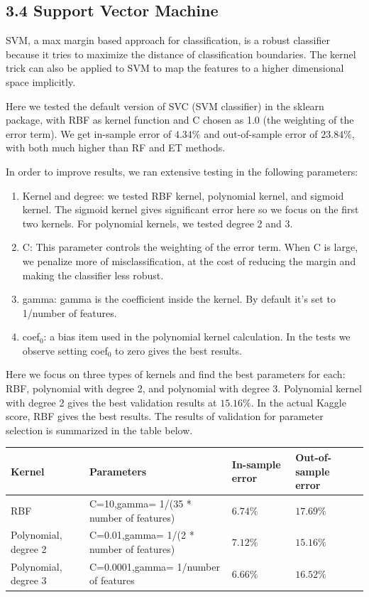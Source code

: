 \documentclass[submit]{harvardml}
\begin{document}
\subsection*{3.4 Support Vector Machine}

SVM, a max margin based approach for classification, is a robust classifier because it tries to maximize the distance of classification boundaries. The kernel trick can also be applied to SVM to map the features to a higher dimensional space implicitly. 

Here we tested the default version of SVC (SVM classifier) in the sklearn package, with RBF as kernel function and C chosen as 1.0 (the weighting of the error term). We get in-sample error of $4.34\%$ and out-of-sample error of $23.84\%$, with both much higher than RF and ET methods. 

In order to improve results, we ran extensive testing in the following parameters:
\begin{enumerate}
\item Kernel and degree: we tested RBF kernel, polynomial kernel, and sigmoid kernel. The sigmoid kernel gives significant error here so we focus on the first two kernels. For polynomial kernels, we tested degree 2 and 3.
\item C: This parameter controls the weighting of the error term. When C is large, we penalize more of misclassification, at the cost of reducing the margin and making the classifier less robust. 
\item gamma: gamma is the coefficient inside the kernel. By default it's set to 1/number of features.
\item coef$_0$: a bias item used in the polynomial kernel calculation. In the tests we observe setting coef$_0$ to zero gives the best results.
\end{enumerate}

Here we focus on three types of kernels and find the best parameters for each: RBF, polynomial with degree 2, and polynomial with degree 3. Polynomial kernel with degree 2 gives the best validation results at $15.16\%$. In the actual Kaggle score, RBF gives the best results. The results of validation for parameter selection is summarized in the table below.

\begin{center}
  \begin{tabular}{ | l | l | l | l | }
    \hline
    Kernel & Parameters & In-sample error & Out-of-sample error \\ \hline
    RBF & C=10,gamma= 1/(35 * number of features) & $6.74\%$ & $17.69\%$ \\ \hline
		Polynomial, degree 2 & C=0.01,gamma= 1/(2 * number of features)  & $7.12\%$ & $15.16\%$ \\ \hline
		Polynomial, degree 3 &  C=0.0001,gamma= 1/number of features & $6.66\%$ & $16.52\%$ \\ \hline
  \end{tabular}
\end{center}
\end{document}
